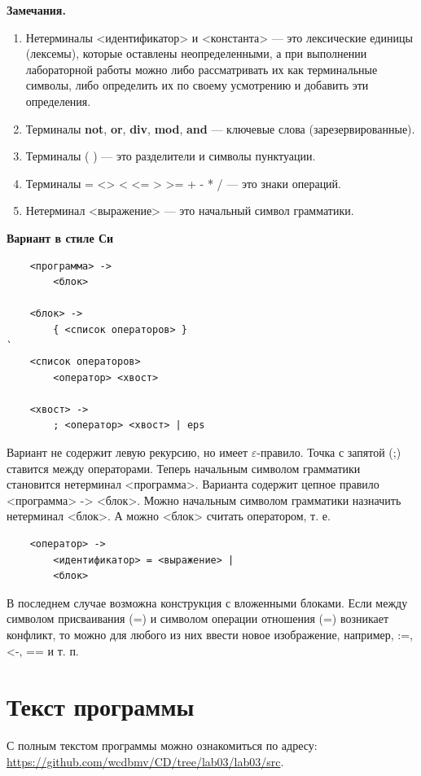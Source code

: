 \documentclass{bmstu-gost-7-32}
\begin{document}
\textbf{Замечания.}

\begin{enumerate}
	\item Нетерминалы <идентификатор> и <константа> — это лексические единицы (лексемы), которые оставлены неопределенными, а при выполнении лабораторной работы можно либо рассматривать их как терминальные символы, либо определить их по своему усмотрению и добавить эти определения.
	\item Терминалы \textbf{not}, \textbf{or}, \textbf{div}, \textbf{mod}, \textbf{and} — ключевые слова (зарезервированные).
	\item Терминалы ( ) — это разделители и символы пунктуации.
	\item Терминалы = <> < <= > >= + - * / — это знаки операций.
	\item Нетерминал <выражение> — это начальный символ грамматики.
\end{enumerate}

\textbf{Вариант в стиле Си}

\begin{verbatim}
	<программа> ->
	    <блок>

	<блок> ->
	    { <список операторов> }
`
	<список операторов>
	    <оператор> <хвост>

	<хвост> ->
	    ; <оператор> <хвост> | eps
\end{verbatim}

Вариант не содержит левую рекурсию, но имеет $\varepsilon$-правило.
Точка с запятой (;) ставится между операторами.
Теперь начальным символом грамматики становится нетерминал <программа>.
Варианта содержит цепное правило <программа> -> <блок>.
Можно начальным символом грамматики назначить нетерминал <блок>. А можно <блок> считать оператором, т. е.

\begin{verbatim}
	<оператор> ->
	    <идентификатор> = <выражение> |
	    <блок>
\end{verbatim}

В последнем случае возможна конструкция с вложенными блоками.
Если между символом присваивания (=) и символом операции отношения (=) возникает конфликт, то можно для любого из них ввести новое изображение, например, :=, <-, == и т. п.

\section*{Текст программы}

С полным текстом программы можно ознакомиться по адресу: \url{https://github.com/wcdbmv/CD/tree/lab03/lab03/src}.
\end{document}
